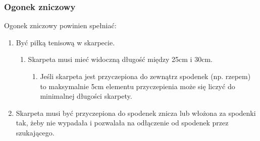 \documentclass[11pt,a4paper]{article}
\begin{document}
\subsubsection{Ogonek zniczowy}
Ogonek zniczowy powinien spełniać:
\begin{enumerate}
  \item Być piłką tenisową w skarpecie.
  \begin{enumerate}
    \item Skarpeta musi mieć widoczną długość między 25cm i 30cm.
    \begin{enumerate}
      \item Jeśli skarpeta jest przyczepiona do zewnątrz spodenek (np. rzepem) to maksymalnie 5cm elementu przyczepienia może się liczyć do minimalnej długości skarpety.
    \end{enumerate}
  \end{enumerate}
  \item Skarpeta musi być przyczepiona do spodenek znicza lub włożona za spodenki tak, żeby nie wypadała i pozwalała na odłączenie od spodenek przez szukającego.
\end{enumerate}
\end{document}
